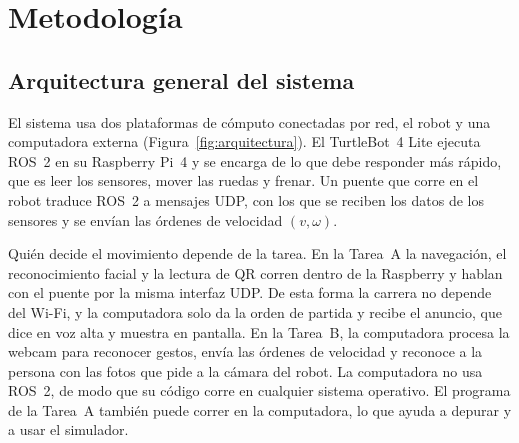 \documentclass[11pt,a4paper]{article}
\begin{document}
\section{Metodología}

\subsection{Arquitectura general del sistema}

El sistema usa dos plataformas de cómputo conectadas por red, el robot y una computadora externa (Figura~\ref{fig:arquitectura}). El TurtleBot~4 Lite ejecuta ROS~2 en su Raspberry Pi~4 y se encarga de lo que debe responder más rápido, que es leer los sensores, mover las ruedas y frenar. Un puente que corre en el robot traduce ROS~2 a mensajes UDP, con los que se reciben los datos de los sensores y se envían las órdenes de velocidad $(v, \omega)$.

Quién decide el movimiento depende de la tarea. En la Tarea~A la navegación, el reconocimiento facial y la lectura de QR corren dentro de la Raspberry y hablan con el puente por la misma interfaz UDP. De esta forma la carrera no depende del Wi-Fi, y la computadora solo da la orden de partida y recibe el anuncio, que dice en voz alta y muestra en pantalla. En la Tarea~B, la computadora procesa la webcam para reconocer gestos, envía las órdenes de velocidad y reconoce a la persona con las fotos que pide a la cámara del robot. La computadora no usa ROS~2, de modo que su código corre en cualquier sistema operativo. El programa de la Tarea~A también puede correr en la computadora, lo que ayuda a depurar y a usar el simulador.
\end{document}
